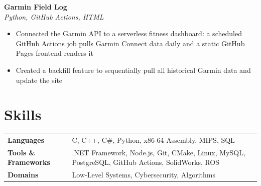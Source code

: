 \documentclass[10pt,letterpaper]{article}
\newcommand{\entry}[4]{%
    \textbf{#1} \hfill #2 \\
    \textit{#3} \hfill \textit{#4} \\
    \vspace{2pt}
}
\begin{document}
\vspace{4pt}

\entry
    {Garmin Field Log}
    {}
    {Python, GitHub Actions, HTML}
    {}

\begin{itemize}
    \item Connected the Garmin API to a serverless fitness dashboard: a scheduled GitHub Actions job pulls Garmin Connect data daily and a static GitHub Pages frontend renders it
    \item Created a backfill feature to sequentially pull all historical Garmin data and update the site
\end{itemize}

\section*{Skills}

\begin{tabularx}{\linewidth}{@{}lX@{}}
\textbf{Languages} &
C, C++, C#, Python, x86-64 Assembly, MIPS, SQL \\[4pt]

\textbf{Tools \& Frameworks} &
.NET Framework, Node.js, Git, CMake, Linux, MySQL, PostgreSQL, GitHub Actions, SolidWorks, ROS \\[4pt]

\textbf{Domains} &
Low-Level Systems, Cybersecurity, Algorithms

\end{tabularx}
\end{document}
